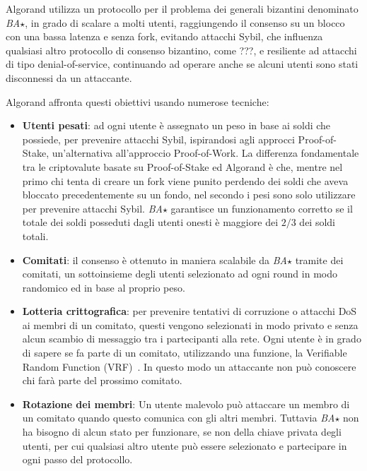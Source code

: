Algorand utilizza un protocollo per il problema dei generali bizantini denominato \emph{BA$\star$}, in grado di scalare a molti utenti, raggiungendo il consenso su un blocco con una bassa latenza e senza fork, evitando attacchi Sybil, che influenza qualsiasi altro protocollo di consenso bizantino, come ???, e resiliente ad attacchi di tipo denial-of-service, continuando ad operare anche se alcuni utenti sono stati disconnessi da un attaccante.

Algorand affronta questi obiettivi usando numerose tecniche:
\begin{itemize}
	\item \textbf{Utenti pesati}: ad ogni utente è assegnato un peso in base ai soldi che possiede, per prevenire attacchi Sybil, ispirandosi agli approcci Proof-of-Stake, un'alternativa all'approccio Proof-of-Work. La differenza fondamentale tra le criptovalute basate su Proof-of-Stake ed Algorand è che, mentre nel primo chi tenta di creare un fork viene punito perdendo dei soldi che aveva bloccato precedentemente su un fondo, nel secondo i pesi sono solo utilizzare per prevenire attacchi Sybil. \emph{BA$\star$} garantisce un funzionamento corretto se il totale dei soldi posseduti dagli utenti onesti è maggiore dei $2/3$ dei soldi totali.
	\item \textbf{Comitati}: il consenso è ottenuto in maniera scalabile da \emph{BA$\star$} tramite dei comitati, un sottoinsieme degli utenti selezionato ad ogni round in modo randomico ed in base al proprio peso.
	\item \textbf{Lotteria crittografica}: per prevenire tentativi di corruzione o attacchi DoS ai membri di un comitato, questi vengono selezionati in modo privato e senza alcun scambio di messaggio tra i partecipanti alla rete. Ogni utente è in grado di sapere se fa parte di un comitato, utilizzando una funzione, la Verifiable Random Function (VRF)~\cite{micali1999verifiable}. In questo modo un attaccante non può conoscere chi farà parte del prossimo comitato.
	\item \textbf{Rotazione dei membri}: Un utente malevolo può attaccare un membro di un comitato quando questo comunica con gli altri membri. Tuttavia \emph{BA$\star$} non ha bisogno di alcun stato per funzionare, se non della chiave privata degli utenti, per cui qualsiasi altro utente può essere selezionato e partecipare in ogni passo del protocollo.
\end{itemize}

